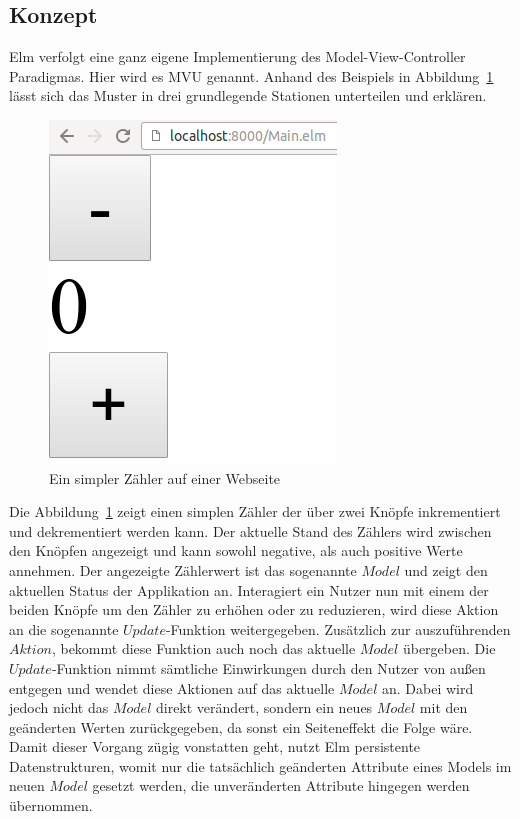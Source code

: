 \subsection{Konzept}
\label{sec:Konzept}
Elm verfolgt eine ganz eigene Implementierung des Model-View-Controller Paradigmas. Hier wird es \ac{MVU} genannt. Anhand des Beispiels in Abbildung~\ref{fig:counter} lässt sich das Muster in drei grundlegende Stationen unterteilen und erklären.
\begin{figure}[h]
	\centering  
	\includegraphics[scale=0.5]{img/counter.png}
	\caption{Ein simpler Zähler auf einer Webseite}\label{fig:counter}
\end{figure}
Die Abbildung~\ref{fig:counter} zeigt einen simplen Zähler der über zwei Knöpfe inkrementiert und dekrementiert werden kann. Der aktuelle Stand des Zählers wird zwischen den Knöpfen angezeigt und kann sowohl negative, als auch positive Werte annehmen.
Der angezeigte Zählerwert ist das sogenannte $Model$ und zeigt den aktuellen Status der Applikation an. Interagiert ein Nutzer nun mit einem der beiden Knöpfe um den Zähler zu erhöhen oder zu reduzieren, wird diese Aktion an die sogenannte $Update$-Funktion weitergegeben. Zusätzlich zur auszuführenden $Aktion$, bekommt diese Funktion auch noch das aktuelle $Model$ übergeben.
Die $Update$-Funktion nimmt sämtliche Einwirkungen durch den Nutzer von außen entgegen und wendet diese Aktionen auf das aktuelle $Model$ an. Dabei wird jedoch nicht das $Model$ direkt verändert, sondern ein neues $Model$ mit den geänderten Werten zurückgegeben, da sonst ein Seiteneffekt die Folge wäre. Damit dieser Vorgang zügig vonstatten geht, nutzt Elm persistente Datenstrukturen, womit nur die tatsächlich geänderten Attribute eines Models im neuen $Model$ gesetzt werden, die unveränderten Attribute hingegen werden übernommen.
